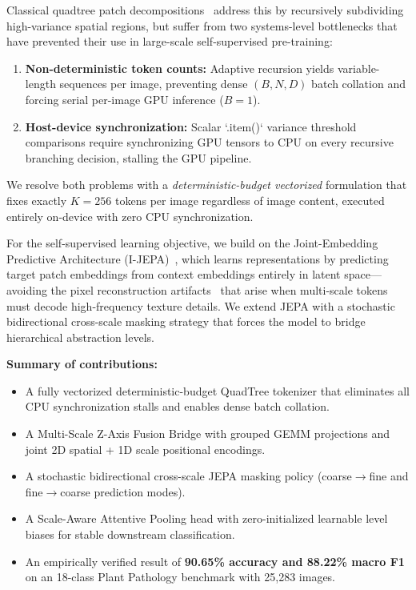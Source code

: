 \documentclass[10pt,twocolumn,letterpaper]{article}
\begin{document}
Classical quadtree patch decompositions~\cite{tang2022quadtree} address this by recursively subdividing high-variance spatial regions, but suffer from two systems-level bottlenecks that have prevented their use in large-scale self-supervised pre-training:

\begin{enumerate}
    \item \textbf{Non-deterministic token counts:} Adaptive recursion yields variable-length sequences per image, preventing dense $(B, N, D)$ batch collation and forcing serial per-image GPU inference ($B=1$).
    \item \textbf{Host-device synchronization:} Scalar `.item()` variance threshold comparisons require synchronizing GPU tensors to CPU on every recursive branching decision, stalling the GPU pipeline.
\end{enumerate}

We resolve both problems with a \textit{deterministic-budget vectorized} formulation that fixes exactly $K=256$ tokens per image regardless of image content, executed entirely on-device with zero CPU synchronization.

For the self-supervised learning objective, we build on the Joint-Embedding Predictive Architecture (I-JEPA)~\cite{assran2023self}, which learns representations by predicting target patch embeddings from context embeddings entirely in latent space—avoiding the pixel reconstruction artifacts~\cite{he2022masked} that arise when multi-scale tokens must decode high-frequency texture details. We extend JEPA with a stochastic bidirectional cross-scale masking strategy that forces the model to bridge hierarchical abstraction levels.

\textbf{Summary of contributions:}
\begin{itemize}
    \item A fully vectorized deterministic-budget QuadTree tokenizer that eliminates all CPU synchronization stalls and enables dense batch collation.
    \item A Multi-Scale Z-Axis Fusion Bridge with grouped GEMM projections and joint 2D spatial + 1D scale positional encodings.
    \item A stochastic bidirectional cross-scale JEPA masking policy (coarse$\to$fine and fine$\to$coarse prediction modes).
    \item A Scale-Aware Attentive Pooling head with zero-initialized learnable level biases for stable downstream classification.
    \item An empirically verified result of \textbf{90.65\% accuracy and 88.22\% macro F1} on an 18-class Plant Pathology benchmark with 25,283 images.
\end{itemize}
\end{document}
